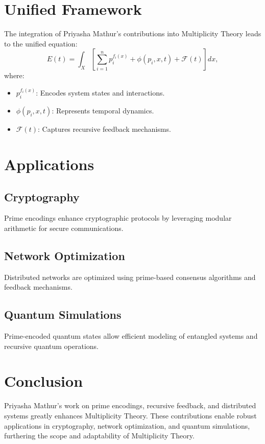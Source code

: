\documentclass{article}
\theoremstyle{plain}
\begin{document}
\section{Unified Framework}
The integration of Priyasha Mathur’s contributions into Multiplicity Theory leads to the unified equation:
\begin{equation}
    E(t) = \int_X \left[ \sum_{i=1}^n p_i^{f_i(x)} + \phi(p_i, x, t) + \mathcal{F}(t) \right] dx,
\end{equation}
where:
\begin{itemize}
    \item \(p_i^{f_i(x)}\): Encodes system states and interactions.
    \item \(\phi(p_i, x, t)\): Represents temporal dynamics.
    \item \(\mathcal{F}(t)\): Captures recursive feedback mechanisms.
\end{itemize}

\section{Applications}

\subsection{Cryptography}
Prime encodings enhance cryptographic protocols by leveraging modular arithmetic for secure communications.

\subsection{Network Optimization}
Distributed networks are optimized using prime-based consensus algorithms and feedback mechanisms.

\subsection{Quantum Simulations}
Prime-encoded quantum states allow efficient modeling of entangled systems and recursive quantum operations.

\section{Conclusion}

Priyasha Mathur’s work on prime encodings, recursive feedback, and distributed systems greatly enhances Multiplicity Theory. These contributions enable robust applications in cryptography, network optimization, and quantum simulations, furthering the scope and adaptability of Multiplicity Theory.
\nocite{*}


\end{document}
